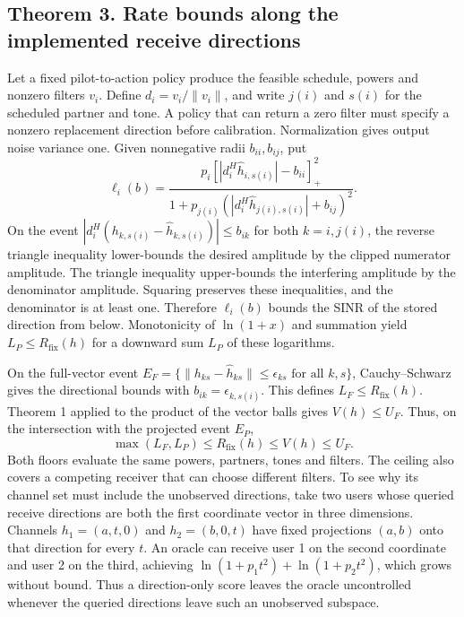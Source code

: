 \subsection{Theorem 3. Rate bounds along the implemented receive directions}
Let a fixed pilot-to-action policy produce the feasible schedule, powers and nonzero filters $v_i$. Define $d_i=v_i/\|v_i\|$, and write $j(i)$ and $s(i)$ for the scheduled partner and tone. A policy that can return a zero filter must specify a nonzero replacement direction before calibration. Normalization gives output noise variance one. Given nonnegative radii $b_{ii},b_{ij}$, put
\begin{equation}
 \ell_i(b)=\frac{p_i[|d_i^H\hat h_{i,s(i)}|-b_{ii}]_+^2}
 {1+p_{j(i)}(|d_i^H\hat h_{j(i),s(i)}|+b_{ij})^2}.
 \label{supp:directional-lower}
\end{equation}
On the event $|d_i^H(h_{k,s(i)}-\hat h_{k,s(i)})|\le b_{ik}$ for both $k=i,j(i)$, the reverse triangle inequality lower-bounds the desired amplitude by the clipped numerator amplitude. The triangle inequality upper-bounds the interfering amplitude by the denominator amplitude. Squaring preserves these inequalities, and the denominator is at least one. Therefore $\ell_i(b)$ bounds the SINR of the stored direction from below. Monotonicity of $\ln(1+x)$ and summation yield $L_P\le R_{\mathrm{fix}}(h)$ for a downward sum $L_P$ of these logarithms.

On the full-vector event $E_F=\{\|h_{ks}-\hat h_{ks}\|\le\epsilon_{ks}\text{ for all }k,s\}$, Cauchy--Schwarz gives the directional bounds with $b_{ik}=\epsilon_{k,s(i)}$. This defines $L_F\le R_{\mathrm{fix}}(h)$. Theorem 1 applied to the product of the vector balls gives $V(h)\le U_F$. Thus, on the intersection with the projected event $E_P$,
\begin{equation}
 \max(L_F,L_P)\le R_{\mathrm{fix}}(h)\le V(h)\le U_F.
 \label{supp:theorem3}
\end{equation}
Both floors evaluate the same powers, partners, tones and filters. The ceiling also covers a competing receiver that can choose different filters. To see why its channel set must include the unobserved directions, take two users whose queried receive directions are both the first coordinate vector in three dimensions. Channels $h_1=(a,t,0)$ and $h_2=(b,0,t)$ have fixed projections $(a,b)$ onto that direction for every $t$. An oracle can receive user 1 on the second coordinate and user 2 on the third, achieving $\ln(1+p_1t^2)+\ln(1+p_2t^2)$, which grows without bound. Thus a direction-only score leaves the oracle uncontrolled whenever the queried directions leave such an unobserved subspace.

